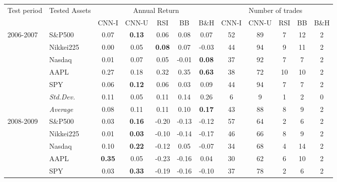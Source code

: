 \documentclass[12pt, a4paper]{article}
\begin{document}
\begin{table}[H]
\begin{tabular}{l|l|ccccc|ccccc}
\multicolumn{1}{m{1cm}|}{\multirow{2}{1cm}{Test period}} & \multicolumn{1}{m{1.5cm}|}{\multirow{2}{1.5cm}{Tested Assets}} &       \multicolumn{5}{c|}{Annual Return} & \multicolumn{5}{c}{Number of trades} \\ \cline{3-12}
  &                  &  CNN-I         & CNN-U         & RSI           & BB            & B\&H          & CNN-I            & CNN-U & RSI & BB & B\&H \\ \hline \hline
\multirow{6}{1cm}{2006-2007} & S\&P500       & 0.07          & \textbf{0.13} & 0.06          & 0.08          & 0.07          & 52               & 89    & 7   & 12 & 2    \\
  & Nikkei225        &  0.00          & 0.05          & \textbf{0.08} & 0.07          & -0.03         & 44               & 94    & 9   & 11 & 2    \\
  & Nasdaq       & 0.01          & 0.07          & 0.05          & -0.01         & \textbf{0.08} & 37               & 92    & 7   & 7  & 2    \\
  & AAPL             & 0.27          & 0.18          & 0.32          & 0.35          & \textbf{0.63} & 38               & 72    & 10  & 10 & 2    \\
  & SPY              & 0.06          & \textbf{0.12} & 0.06          & 0.03          & 0.09          & 44               & 94    & 7   & 7  & 2    \\ 
  \cline{2-12}
  & \textit{Std.Dev.}  & 0.11 & 0.05 & 0.11 & 0.14 & 0.26 & 6 & 9 & 1 & 2 & 0    \\
  \cline{2-12}
  & \textit{Average}  & 0.08          & 0.11          & 0.11          & 0.10          & \textbf{0.17} & 43               & 88    & 8   & 9  & 2    \\ \hline
\multirow{6}{1cm}{2008-2009} & S\&P500           & 0.03 & \textbf{0.16} & -0.20 & -0.13 & -0.12 & 57 & 64 & 2 & 6  & 2 \\
 & Nikkei225         & 0.01 & \textbf{0.03} & -0.10 & -0.14 & -0.17 & 46 & 66 & 8 & 9  & 2 \\
 & Nasdaq            & 0.10 & \textbf{0.22} & -0.12 & 0.05  & -0.07 & 34 & 68 & 4 & 14 & 2 \\
 & AAPL              & \textbf{0.35} & 0.05 & -0.23 & -0.16 & 0.04  & 30 & 62 & 6 & 10 & 2 \\
 & SPY               & 0.03 & \textbf{0.33} & -0.19 & -0.16 & -0.10 & 37 & 78 & 2 & 6  & 2 \\ \cline{2-12} 

\end{tabular}
\end{table}
\end{document}
